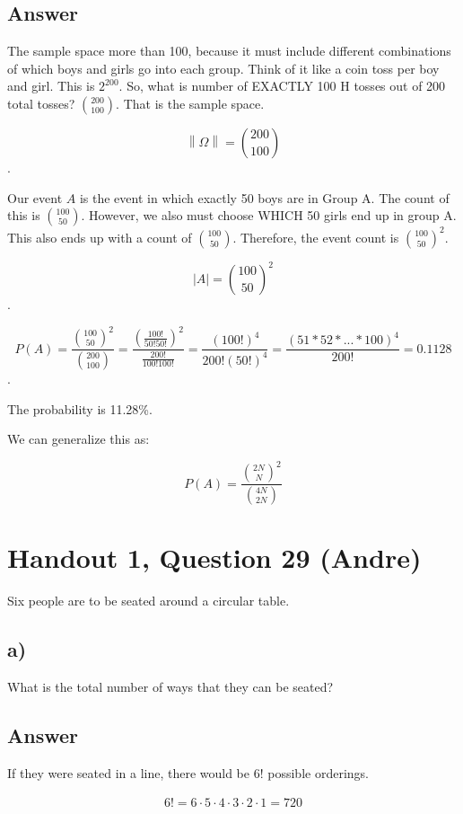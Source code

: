 \documentclass[11pt]{article}
\begin{document}
\subsection*{Answer}

The sample space more than 100, because it must include different combinations 
of which boys and girls go into each group.
Think of it like a coin toss per boy and girl. This is \(2^{200}\). 
So, what is number of EXACTLY 100 H tosses out of 200 total tosses?
\(\binom{200}{100}\).
That is the sample space.

\[\left\|\Omega\right\| = \binom{200}{100}\].

Our event \(A\) is the event in which exactly 50 boys are in Group A.
The count of this is \(\binom{100}{50}\).
However, we also must choose WHICH 50 girls end up in group A.
This also ends up with a count of \(\binom{100}{50}\).
Therefore, the event count is \(\binom{100}{50}^2\).

\[\left|A\right| = \binom{100}{50}^2\].

\[P(A) = \frac{\binom{100}{50}^2}{\binom{200}{100}} = 
\frac{(\frac{100!}{50!50!})^2}{\frac{200!}{100!100!}} =
\frac{(100!)^4}{200!(50!)^4} =
\frac{(51*52*...*100)^4}{200!} =
0.1128
\].


The probability is 11.28\%. 

We can generalize this as:

\[P(A) = \frac{\binom{2N}{N}^2}{\binom{4N}{2N}}\]

\section*{Handout 1, Question 29 (Andre)}

Six people are to be seated around a circular table.

\subsection*{a)}

What is the total number of ways that they can be seated?

\subsection*{Answer}

If they were seated in a line, there would be \(6!\) possible orderings.

\begin{align*}
    6! = 6\cdot5\cdot4\cdot3\cdot2\cdot1=720
\end{align*}
\end{document}
